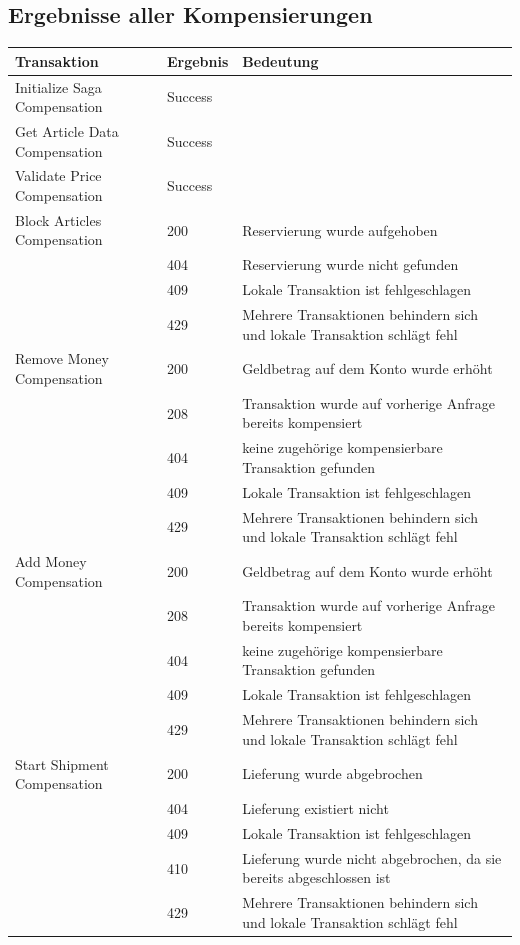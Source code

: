 \subsection{Ergebnisse aller Kompensierungen}
\begin{center}
	\begin{longtable}[h]{|p{5.5cm}|p{1.5cm}|p{8.5cm}|}
		\hline
		Transaktion 						& Ergebnis 	& Bedeutung \\ \hline
		Initialize Saga Compensation	 	& Success 	& \\ \hline
		Get Article Data Compensation	 	& Success 	& \\ \hline	
		Validate Price Compensation	 		& Success 	& \\ \hline
		Block Articles Compensation	 		& 200	 	& Reservierung wurde aufgehoben \\
											& 404		& Reservierung wurde nicht gefunden \\
											& 409		& Lokale Transaktion ist fehlgeschlagen \\
											& 429 		& Mehrere Transaktionen behindern sich und lokale Transaktion schlägt fehl \\ \hline
		Remove Money Compensation		 	& 200		& Geldbetrag auf dem Konto wurde erhöht \\
											& 208		& Transaktion wurde auf vorherige Anfrage bereits kompensiert \\
											& 404 		& keine zugehörige kompensierbare Transaktion gefunden \\
											& 409		& Lokale Transaktion ist fehlgeschlagen \\
											& 429		& Mehrere Transaktionen behindern sich und lokale Transaktion schlägt fehl \\ \hline
		Add Money Compensation		 		& 200		& Geldbetrag auf dem Konto wurde erhöht \\
											& 208		& Transaktion wurde auf vorherige Anfrage bereits kompensiert \\
											& 404		& keine zugehörige kompensierbare Transaktion gefunden \\
											& 409		& Lokale Transaktion ist fehlgeschlagen \\
											& 429		& Mehrere Transaktionen behindern sich und lokale Transaktion schlägt fehl \\ \hline
		Start Shipment Compensation	 		& 200	 	& Lieferung wurde abgebrochen \\
			 								& 404		& Lieferung existiert nicht \\
											& 409		& Lokale Transaktion ist fehlgeschlagen \\
											& 410		& Lieferung wurde nicht abgebrochen, da sie bereits abgeschlossen ist \\
											& 429		& Mehrere Transaktionen behindern sich und lokale Transaktion schlägt fehl \\ \hline
	\end{longtable}
\end{center}
\FloatBarrier

